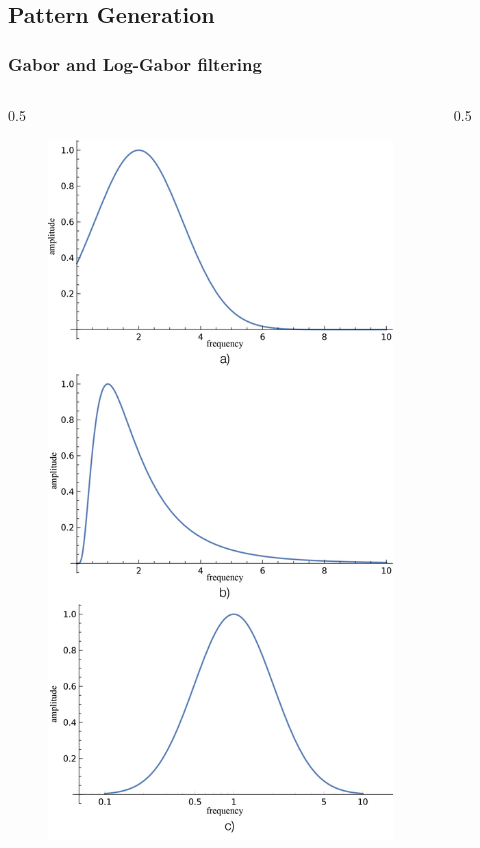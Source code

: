 \documentclass{beamer}
\begin{document}
\subsection{Pattern Generation} 
\begin{frame}
	[fragile] \frametitle{Gabor and Log-Gabor filtering} 
	\begin{columns}
		\begin{column}
			{0.5
			\textwidth} 
			\begin{figure}
				[t] \centering 
				\includegraphics[width=0.62
				\textwidth]{../report/iris/freq_response_gabor.png} \label{fig:frequency_response} 
			\end{figure}
		\end{column}
		\begin{column}
			{0.5
			\textwidth} 
			\begin{figure}
				[t] \centering 

\end{figure}
\end{column}
\end{columns}
\end{frame}
\end{document}
